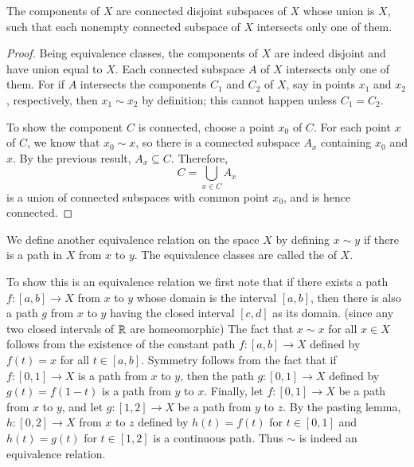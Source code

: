 \documentclass[12pt, a4paper, oneside, openright, titlepage]{book}
\begin{document}
\begin{theorem}
    The components of $X$ are connected disjoint subspaces of $X$ whose union is $X$, such that each nonempty connected subspace of $X$ intersects only one of them.
\end{theorem}
\begin{proof}
    Being equivalence classes, the components of $X$ are indeed disjoint and have union equal to $X$. Each connected subspace $A$ of $X$ intersects only one of them. For if $A$ intersects the components $C_1$ and $C_2$ of $X$, say in points $x_1$ and $x_2$, respectively, then $x_1 \sim x_2$ by definition; this cannot happen unless $C_1 = C_2$.

    To show the component $C$ is connected, choose a point $x_0$ of $C$. For each point $x$ of $C$, we know that $x_0 \sim x$, so there is a connected subspace $A_x$ containing $x_0$ and $x$. By the previous result, $A_x \subseteq C$. Therefore, \begin{equation*}
        C = \bigcup\limits_{x\in C} A_x
    \end{equation*}
    is a union of connected subspaces with common point $x_0$, and is hence connected.
\end{proof}

\begin{definition}
    We define another equivalence relation on the space $X$ by defining $x \sim y$ if there is a path in $X$ from $x$ to $y$. The equivalence classes are called the  of $X$.
\end{definition}

To show this is an equivalence relation we first note that if there exists a path $f:[a,b]\rightarrow X$ from $x$ to $y$ whose domain is the interval $[a,b]$, then there is also a path $g$ from $x$ to $y$ having the closed interval $[c,d]$ as its domain. (since any two closed intervals of $\mathbb R$ are homeomorphic) The fact that $x \sim x$ for all $x \in X$ follows from the existence of the constant path $f:[a,b]\rightarrow X$ defined by $f(t) = x$ for all $t \in [a,b]$. Symmetry follows from the fact that if $f:[0,1]\rightarrow X$ is a path from $x$ to $y$, then the path $g:[0,1]\rightarrow X$ defined by $g(t) = f(1-t)$ is a path from $y$ to $x$. Finally, let $f:[0,1]\rightarrow X$ be a path from $x$ to $y$, and let $g:[1,2]\rightarrow X$ be a path from $y$ to $z$. By the pasting lemma, $h:[0,2]\rightarrow X$ from $x$ to $z$ defined by $h(t) = f(t)$ for $t \in [0,1]$ and $h(t) = g(t)$ for $t \in [1,2]$ is a continuous path. Thus $\sim$ is indeed an equivalence relation.
\end{document}
